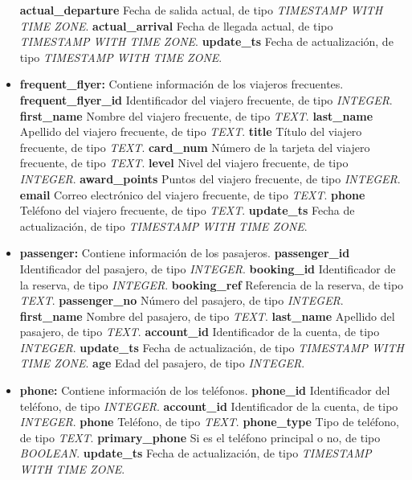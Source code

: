 \documentclass[11pt]{report}
\begin{document}
\begin{itemize}
    \subitem \textbf{actual\_departure} Fecha de salida actual, de tipo \emph{TIMESTAMP WITH TIME ZONE}.
    \subitem \textbf{actual\_arrival} Fecha de llegada actual, de tipo \emph{TIMESTAMP WITH TIME ZONE}.
    \subitem \textbf{update\_ts} Fecha de actualización, de tipo \emph{TIMESTAMP WITH TIME ZONE}.
  \item \textbf{frequent\_flyer:} Contiene información de los viajeros frecuentes.
    \subitem \textbf{frequent\_flyer\_id} Identificador del viajero frecuente, de tipo \emph{INTEGER}.
    \subitem \textbf{first\_name} Nombre del viajero frecuente, de tipo \emph{TEXT}.
    \subitem \textbf{last\_name} Apellido del viajero frecuente, de tipo \emph{TEXT}.
    \subitem \textbf{title} Título del viajero frecuente, de tipo \emph{TEXT}.
    \subitem \textbf{card\_num} Número de la tarjeta del viajero frecuente, de tipo \emph{TEXT}.
    \subitem \textbf{level} Nivel del viajero frecuente, de tipo \emph{INTEGER}.
    \subitem \textbf{award\_points} Puntos del viajero frecuente, de tipo \emph{INTEGER}.
    \subitem \textbf{email} Correo electrónico del viajero frecuente, de tipo \emph{TEXT}.
    \subitem \textbf{phone} Teléfono del viajero frecuente, de tipo \emph{TEXT}.
    \subitem \textbf{update\_ts} Fecha de actualización, de tipo \emph{TIMESTAMP WITH TIME ZONE}.
  \item \textbf{passenger:} Contiene información de los pasajeros.
    \subitem \textbf{passenger\_id} Identificador del pasajero, de tipo \emph{INTEGER}.
    \subitem \textbf{booking\_id} Identificador de la reserva, de tipo \emph{INTEGER}.
    \subitem \textbf{booking\_ref} Referencia de la reserva, de tipo \emph{TEXT}.
    \subitem \textbf{passenger\_no} Número del pasajero, de tipo \emph{INTEGER}.
    \subitem \textbf{first\_name} Nombre del pasajero, de tipo \emph{TEXT}.
    \subitem \textbf{last\_name} Apellido del pasajero, de tipo \emph{TEXT}.
    \subitem \textbf{account\_id} Identificador de la cuenta, de tipo \emph{INTEGER}.
    \subitem \textbf{update\_ts} Fecha de actualización, de tipo \emph{TIMESTAMP WITH TIME ZONE}.
    \subitem \textbf{age} Edad del pasajero, de tipo \emph{INTEGER}.
  \item \textbf{phone:} Contiene información de los teléfonos.
    \subitem \textbf{phone\_id} Identificador del teléfono, de tipo \emph{INTEGER}.
    \subitem \textbf{account\_id} Identificador de la cuenta, de tipo \emph{INTEGER}.
    \subitem \textbf{phone} Teléfono, de tipo \emph{TEXT}.
    \subitem \textbf{phone\_type} Tipo de teléfono, de tipo \emph{TEXT}.
    \subitem \textbf{primary\_phone} Si es el teléfono principal o no, de tipo \emph{BOOLEAN}.
    \subitem \textbf{update\_ts} Fecha de actualización, de tipo \emph{TIMESTAMP WITH TIME ZONE}.
\end{itemize}
\end{document}
